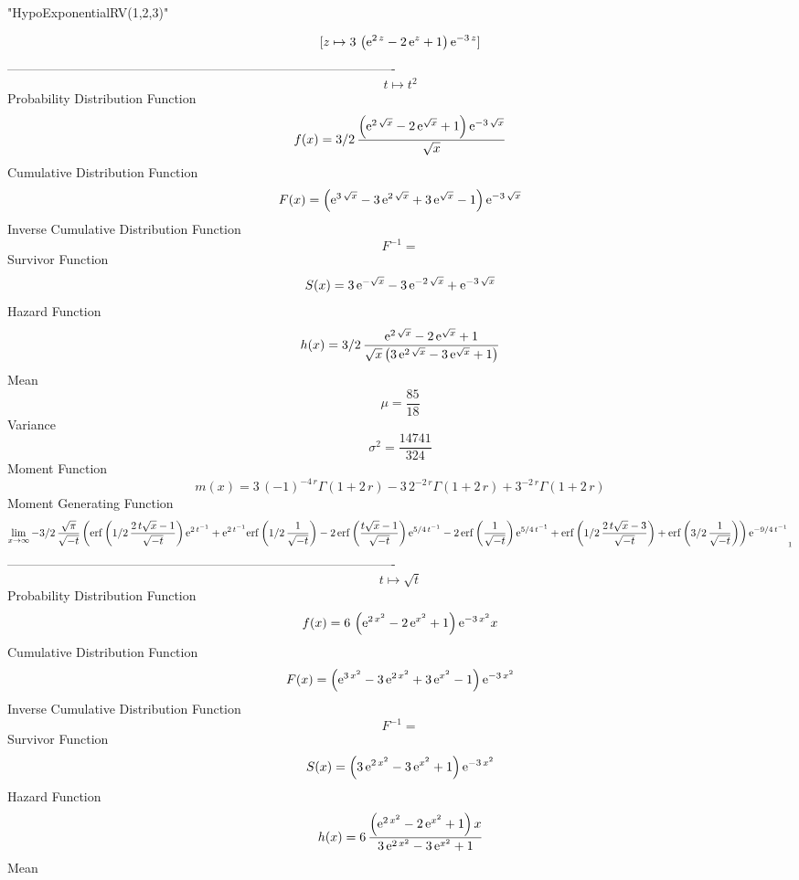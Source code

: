 \documentclass[12pt]{article}
\begin{document}
 
                         "HypoExponentialRV(1,2,3)"

$$[z\mapsto 3\, \left( {{\rm e}^{2\,z}}-2\,{{\rm e}^{z}}+1 \right) {
{\rm e}^{-3\,z}}]
$$-------------------------------------------------------------------------------------------  \\$$t\mapsto {t}^{2}
$$Probability Distribution Function 
$$  f(x)=3/2\,{\frac { \left( {{\rm e}^{2\,\sqrt {x}}}-2\,{{\rm e}^{\sqrt {x}}}
+1 \right) {{\rm e}^{-3\,\sqrt {x}}}}{\sqrt {x}}}
$$Cumulative Distribution Function  
 $$F(x)= \left( {{\rm e}^{3\,\sqrt {x}}}-3\,{{\rm e}^{2\,\sqrt {x}}}+3\,{
{\rm e}^{\sqrt {x}}}-1 \right) {{\rm e}^{-3\,\sqrt {x}}}
$$ Inverse Cumulative Distribution Function 
  $$F^{-1} =
$$Survivor Function 
 $$ S(x)=3\,{{\rm e}^{-\sqrt {x}}}-3\,{{\rm e}^{-2\,\sqrt {x}}}+{{\rm e}^{-3\,
\sqrt {x}}}
$$ Hazard Function 
 $$ h(x)=3/2\,{\frac {{{\rm e}^{2\,\sqrt {x}}}-2\,{{\rm e}^{\sqrt {x}}}+1}{
\sqrt {x} \left( 3\,{{\rm e}^{2\,\sqrt {x}}}-3\,{{\rm e}^{\sqrt {x}}}+
1 \right) }}
$$Mean 
 $$ \mu={\frac{85}{18}}
$$ Variance 
 $$ \sigma^2 = {\frac{14741}{324}}
$$Moment Function 
 $$ m(x) = 3\, \left( -1 \right) ^{-4\,r}\Gamma \left( 1+2\,r \right) -3\,{2}^{-2
\,r}\Gamma \left( 1+2\,r \right) +{3}^{-2\,r}\Gamma \left( 1+2\,r
 \right) 
$$ Moment Generating Function 
 $$\lim _{x\rightarrow \infty }-3/2\,{\frac {\sqrt {\pi}}{\sqrt {-t}}
 \left( {\rm erf} \left(1/2\,{\frac {2\,t\sqrt {x}-1}{\sqrt {-t}}}
\right){{\rm e}^{2\,{t}^{-1}}}+{{\rm e}^{2\,{t}^{-1}}}{\rm erf} \left(
1/2\,{\frac {1}{\sqrt {-t}}}\right)-2\,{\rm erf} \left({\frac {t\sqrt 
{x}-1}{\sqrt {-t}}}\right){{\rm e}^{5/4\,{t}^{-1}}}-2\,{\rm erf} 
\left({\frac {1}{\sqrt {-t}}}\right){{\rm e}^{5/4\,{t}^{-1}}}+
{\rm erf} \left(1/2\,{\frac {2\,t\sqrt {x}-3}{\sqrt {-t}}}\right)+
{\rm erf} \left(3/2\,{\frac {1}{\sqrt {-t}}}\right) \right) {{\rm e}^{
-9/4\,{t}^{-1}}}}_{{1}}
$$-------------------------------------------------------------------------------------------  \\$$t\mapsto \sqrt {t}
$$Probability Distribution Function 
$$  f(x)=6\, \left( {{\rm e}^{2\,{x}^{2}}}-2\,{{\rm e}^{{x}^{2}}}+1 \right) {
{\rm e}^{-3\,{x}^{2}}}x
$$Cumulative Distribution Function  
 $$F(x)= \left( {{\rm e}^{3\,{x}^{2}}}-3\,{{\rm e}^{2\,{x}^{2}}}+3\,{{\rm e}^{
{x}^{2}}}-1 \right) {{\rm e}^{-3\,{x}^{2}}}
$$ Inverse Cumulative Distribution Function 
  $$F^{-1} =
$$Survivor Function 
 $$ S(x)= \left( 3\,{{\rm e}^{2\,{x}^{2}}}-3\,{{\rm e}^{{x}^{2}}}+1 \right) {
{\rm e}^{-3\,{x}^{2}}}
$$ Hazard Function 
 $$ h(x)=6\,{\frac { \left( {{\rm e}^{2\,{x}^{2}}}-2\,{{\rm e}^{{x}^{2}}}+1
 \right) x}{3\,{{\rm e}^{2\,{x}^{2}}}-3\,{{\rm e}^{{x}^{2}}}+1}}
$$Mean 
\end{document}
